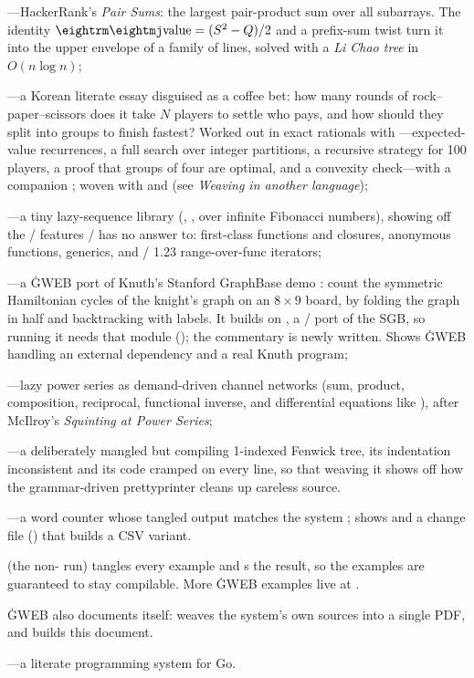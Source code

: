 \bull {}---HackerRank's {\it Pair Sums\/}: the largest pair-product
sum over all subarrays. The identity ${\rm value} = (S^2-Q)/2$ and a prefix-sum
twist turn it into the upper envelope of a family of lines, solved with a
{\sl Li Chao tree\/} in $O(n\log n)$;

\bull {}---a Korean literate essay disguised as a coffee bet: how many
rounds of rock--paper--scissors does it take $N$ players to settle who pays,
and how should they split into groups to finish fastest? Worked out in exact
rationals with ---expected-value recurrences, a full search over
integer partitions, a recursive strategy for 100 players, a proof that groups
of four are optimal, and a convexity check---with a companion
; woven with  and  (see {\it Weaving
in another language\/});

\bull {}---a tiny lazy-sequence library (, ,
 over infinite Fibonacci numbers), showing off the \GO/ features
\CEE/ has no answer to: first-class functions and closures, anonymous
functions, generics, and \GO/ 1.23 range-over-func iterators;

\bull {}---a \.{GWEB} port of Knuth's Stanford GraphBase demo
: count the symmetric Hamiltonian cycles of the knight's graph on an
$8\times9$ board, by folding the graph in half and backtracking with 
labels. It builds on , a \GO/
port of the SGB, so running it needs that module (); the commentary is newly written. Shows \.{GWEB}
handling an external dependency and a real Knuth program;

\bull {}---lazy power series as demand-driven channel networks
(sum, product, composition, reciprocal, functional inverse, and differential
equations like ), after McIlroy's {\it Squinting at Power Series};

\bull {}---a deliberately mangled but compiling 1-indexed Fenwick
tree, its indentation inconsistent and its code cramped on every line, so that
weaving it shows off how the grammar-driven prettyprinter cleans up careless
source.

\bull {}---a word counter whose tangled output matches the system
; shows  and a change file () that builds a CSV
variant.

\noindent {} (the non- run) tangles every example and
s the result, so the examples are guaranteed to stay compilable.
More \.{GWEB} examples live at
.

\noindent \.{GWEB} also documents itself:  weaves the system's own
 sources into a single PDF, and  builds this document.

\vfill
\centerline{---a literate programming system for Go.}
\bye
